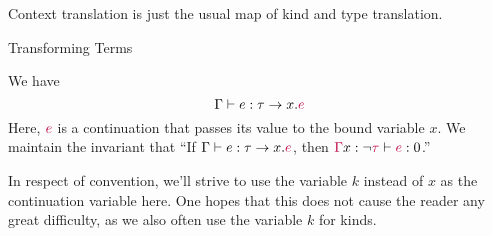 \documentclass{amsart}
\makeatletter
\renewcommand\subsection{\@startsection{subsection}{2}%
  \z@{-.5\linespacing\@plus-.7\linespacing}{.5\linespacing}%
  {\normalfont\scshape}}
\newcommand{\iin}{\text{ \texttt{in} }}
\newcommand{\llet}{\text{\texttt{let} }}
\newcommand{\src}[1]{{\color{purple}#1}}
\makeatother
\begin{document}
Context translation is just the usual map of kind and type translation.

\subsection{Transforming Terms}

We have
\[
\Gamma\vdash e :\tau \rightarrow x.\src{e}
\]
Here, $\src{e}$ is a continuation that passes its value to the bound variable $x$. We maintain the invariant that ``If $\Gamma\vdash e:\tau \rightarrow x.\src{e}$, then $\src{\Gamma}x:\neg\src{\tau}\vdash\src{e}:0$.''

In respect of convention, we'll strive to use the variable $k$ instead of $x$ as the continuation variable here. One hopes that this does not cause the reader any great difficulty, as we also often use the variable $k$ for kinds.

\end{document}
